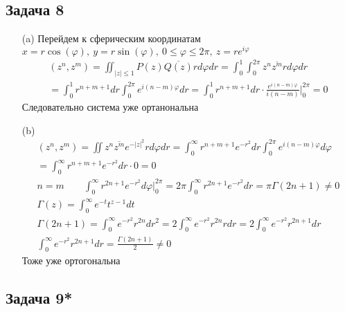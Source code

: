 \subsection*{Задача 8}
\begin{enumerate}
\item[(a)]
	Перейдем к сферическим координатам $x = r \cos(\varphi),\ y = r \sin(\varphi),\ 0 \leqslant \varphi \leqslant 2\pi,\ z = r e^{i \varphi}$
	\begin{gather*}
		(z^n,z^m) = \iint_{|z| \leqslant 1} P(z) \overline{Q(z)} r d\varphi dr
		= \int_{0}^{1} \int_{0}^{2\pi} z^n \overline{z^m} r d\varphi dr\\
		= \int_{0}^{1} r^{n+m+1} dr \int_{0}^{2\pi} e^{i(n-m)\varphi} dr
		= \int_{0}^{1} r^{n+m+1}dr \cdot \frac{e^{i(n-m)\varphi}}{i(n-m)}\bigg|_{0}^{2\pi} = 0
	\end{gather*}
	Следовательно система уже ортанональна
\item[(b)]
	\begin{gather*}
		(z^n,z^m) = \iint z^n \overline{z^m} e^{-|z|^2} r d\varphi dr
		= \int_{0}^{\infty} r^{n+m+1}e^{-r^2}dr \int_{0}^{2\pi} e^{i(n-m)\varphi}d\varphi\\
		= \int_{0}^{\infty} r^{n+m+1}e^{-r^2}dr \cdot 0
		= 0\\
		n = m\qquad \int_{0}^{\infty} r^{2n + 1}e^{-r^2} d \varphi\bigg|_{0}^{2\pi}
		= 2\pi \int_{0}^{\infty} r^{2n+1} e^{-r^2} dr
		= \pi \Gamma(2n+1) \ne 0\\
		\Gamma(z) = \int_{0}^{\infty} e^{-t} t^{z-1} dt\\
		\Gamma(2n+1) = \int_{0}^{\infty} e^{-r^2} r^{2n} dr^2
		= 2 \int_{0}^{\infty} e^{-r^2} r^{2n} rdr
		= 2 \int_{0}^{\infty} e^{-r^2} r^{2n+1} dr\\
		\int_{0}^{\infty} e^{-r^2} r^{2n+1} dr = \frac{\Gamma(2n+1)}{2} \ne 0
	\end{gather*}
	Тоже уже ортогональна
\end{enumerate}
\vskip 0.4in

\subsection*{Задача 9*}

\vskip 0.4in

